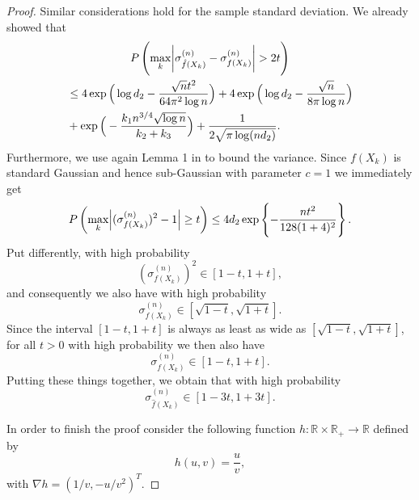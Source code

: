 \begin{proof}
    Similar considerations hold for the sample standard deviation. We already showed that
    \begin{multline*}
        P\left(\max_k \abs{\sigma^{(n)}_{\hat{f}(X_k)} - \sigma^{(n)}_{f(X_k)}} > 2t \right) \\
        \begin{aligned}
            &\leq 4\exp\Big(\log d_2 -\frac{\sqrt{n}t^2}{64 \pi^2\log n}\Big) +  4\exp\Big(\log d_2 - \frac{\sqrt{n}}{8\pi\log n}\Big) \\
            &+  \exp\Big(- \frac{k_1 n^{3/4} \sqrt{\log n}}{k_2+ k_3} \Big) + \frac{1}{2\sqrt{\pi \log(nd_2)}}.
        \end{aligned}
    \end{multline*}
    Furthermore, we use again Lemma 1 in \citet{Ravikumar11} to bound the variance. Since $f(X_k)$ is standard Gaussian and hence sub-Gaussian with parameter $c = 1$ we immediately get
    \begin{equation*}
        P\left(\max_k \abs{(\sigma^{(n)}_{{f}(X_k)})^2 - 1} \geq t \right) \leq 4d_2\exp \left\{- \frac{nt^2}{128(1+4)^2} \right\}.
    \end{equation*}
    Put differently, with high probability 
    \begin{equation*}
        (\sigma^{(n)}_{{f}(X_k)})^2 \in [1 - t, 1+ t],
    \end{equation*}
    and consequently we also have with high probability 
    \begin{equation*}
        \sigma^{(n)}_{{f}(X_k)} \in [\sqrt{1 -t}, \sqrt{1+t} ].
    \end{equation*}
    Since the interval $[1 -t, 1+t ]$ is always as least as wide as $[\sqrt{1 -t}, \sqrt{1+t} ]$, for all $t >0$ with high probability we then also have
    \begin{equation*}
        \sigma^{(n)}_{{f}(X_k)} \in [1 -t, 1+t ].
    \end{equation*}
    Putting these things together, we obtain that with high probability
    \begin{equation*}
        \sigma^{(n)}_{\hat{f}(X_k)} \in [1- 3t , 1 +3t]. 
    \end{equation*}
    
    In order to finish the proof consider the following function $h: \mathbb{R}\times \mathbb{R}_+ \to \mathbb{R}$ defined by
    \begin{equation*}
        h(u,v) = \frac{u}{v},
    \end{equation*}
    with $\nabla h = (1/v, -u/v^{2})^{T}$.
    

\end{proof}
